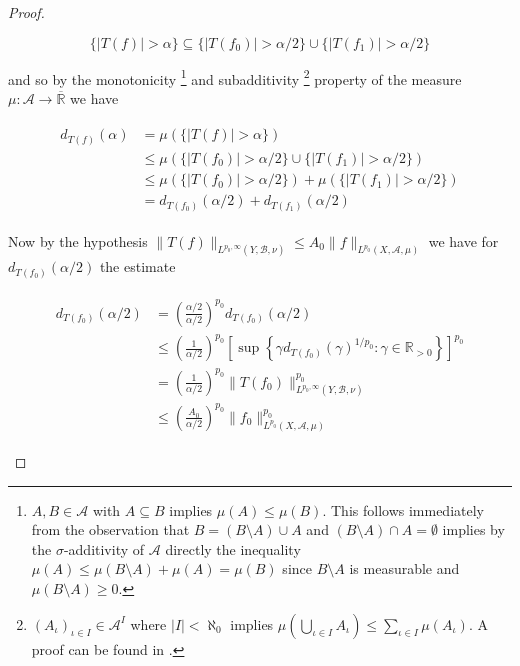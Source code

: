 \begin{proof}
\begin{enumerate}[label = \textbf{(\roman*.)}]
\begin{enumerate}[label = \textbf{\alph*.}]
\begin{equation*}
	\{\vert T(f)\vert > \alpha \} \subseteq \{\vert T(f_0) \vert > \alpha/2 \} \cup \{\vert T(f_1) \vert > \alpha/2 \}
\end{equation*}

and so by the monotonicity \footnote{$A,B \in \mathcal{A}$ with $A \subseteq B$ implies $\mu(A) \leqslant \mu(B)$. This follows immediately from the observation that $B = (B \setminus A) \cup A$ and $(B \setminus A) \cap A = \emptyset$ implies by the $\sigma$-additivity of $\mathcal{A}$ directly the inequality $\mu(A) \leqslant \mu(B\setminus A) + \mu(A) = \mu(B)$ since $B\setminus A$ is measurable and $\mu(B\setminus A) \geqslant 0$.} and subadditivity \footnote{$(A_\iota)_{\iota \in I} \in \mathcal{A}^I$ where $\vert I \vert < \aleph_0$ implies $\displaystyle \mu\left( \bigcup\limits_{\iota \in I} A_\iota \right) \leqslant \sum\limits_{\iota \in I} \mu(A_\iota)$. A proof can be found in \cite[31]{elstrodt:mass:2011}.} property of the measure $\mu: \mathcal{A} \rightarrow \overline{\mathbb{R}}$ we have

\begin{gather}
	\begin{aligned}
	d_{T(f)}(\alpha) &= \mu(\{\vert T(f)\vert > \alpha\})\\
	&\leqslant \mu(\{\vert T(f_0)\vert > \alpha/2 \} \cup \{\vert T(f_1)\vert > \alpha/2 \})\\
	&\leqslant \mu(\{\vert T(f_0) \vert > \alpha/2 \}) + \mu(\{\vert T(f_1)\vert > \alpha/2 \})\\
	&= d_{T(f_0)}(\alpha/2) + d_{T(f_1)}(\alpha/2)
	\label{est:T}
	\end{aligned}
\end{gather}

Now by the hypothesis $\|T(f)\|_{L^{p_0,\infty}(Y,\mathcal{B},\nu)} \leqslant A_0 \|f\|_{L^{p_0}(X,\mathcal{A},\mu)}$ we have for $d_{T(f_0)}(\alpha/2)$ the estimate

\begin{gather}
	\begin{aligned}
		d_{T(f_0)}(\alpha/2) &= \left(\frac{\alpha/2}{\alpha/2}\right)^{p_0} d_{T(f_0)}(\alpha/2)\\
		&\leqslant \left(\frac{1}{\alpha/2}\right)^{p_0} \left[\sup\left\{ \gamma d_{T(f_0)}(\gamma)^{1/p_0}: \gamma \in \mathbb{R}_{>0}\right\}\right]^{p_0}\\
	 & = \left(\frac{1}{\alpha/2}\right)^{p_0} \|T(f_0)\|^{p_0}_{L^{p_0,\infty}(Y,\mathcal{B},\nu)}\\
	 & \leqslant \left(\frac{A_0}{\alpha/2}\right)^{p_0} \|f_0\|^{p_0}_{L^{p_0}(X,\mathcal{A},\mu)}
	\label{est:p_0}
	\end{aligned}
\end{gather}


\end{enumerate}
\end{enumerate}
\end{proof}

